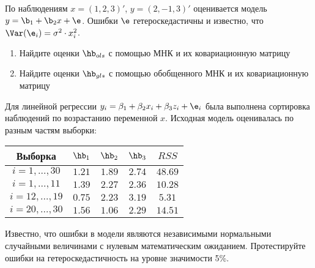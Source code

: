 \documentclass[pdftex,11pt,openany]{book}\usepackage[]{graphicx}\usepackage[]{color}
\begin{document}
\begin{problem}
По наблюдениям $x=(1,2,3)'$, $y=(2,-1,3)'$ оценивается модель $y=\b_1+\b_2 x+\e$. Ошибки $\e$ гетероскедастичны и известно, что $\Var(\e_i)=\sigma^2 \cdot x_i^2$.
\begin{enumerate}
\item Найдите оценки $\hb_{ols}$ с помощью МНК и их ковариационную матрицу
\item Найдите оценки $\hb_{gls}$ с помощью обобщенного МНК и их ковариационную матрицу
\end{enumerate}
\end{problem}

\begin{solution}
\end{solution}




\begin{problem}
Для линейной регрессии $y_i = \beta_1 + \beta_2 x_i + \beta_3 z_i + \e_i$ была
выполнена сортировка наблюдений по возрастанию переменной $x$. Исходная модель оценивалась по разным частям выборки:

\begin{tabular}{c|cccc}
Выборка & $\hb_1$ & $\hb_2$ & $\hb_3$ & $RSS$ \\
\hline
$i=1,\ldots, 30$ & $1.21$ & $1.89$ & $2.74$ & $48.69$ \\
$i=1,\ldots, 11$ & $1.39$ & $2.27$ & $2.36$ & $10.28$ \\
$i=12,\ldots, 19$ & $0.75$ & $2.23$ & $3.19$ & $5.31$ \\
$i=20,\ldots, 30$ & $1.56$ & $1.06$ & $2.29$ & $14.51$ \\
\end{tabular}

Известно, что ошибки в модели являются независимыми нормальными случайными величинами с нулевым математическим ожиданием. Протестируйте
ошибки на гетероскедастичность на уровне значимости 5\%.
\end{problem}
\end{document}
